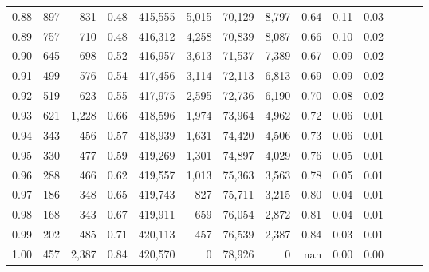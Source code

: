 \begin{tabular}{rrrrrrrrrrrrrr}
0.88 &     897 &    831 &  0.48 &  415,555 &    5,015 &  70,129 &   8,797 &  0.64 &  0.11 &      0.03 \\
0.89 &     757 &    710 &  0.48 &  416,312 &    4,258 &  70,839 &   8,087 &  0.66 &  0.10 &      0.02 \\
0.90 &     645 &    698 &  0.52 &  416,957 &    3,613 &  71,537 &   7,389 &  0.67 &  0.09 &      0.02 \\
0.91 &     499 &    576 &  0.54 &  417,456 &    3,114 &  72,113 &   6,813 &  0.69 &  0.09 &      0.02 \\
0.92 &     519 &    623 &  0.55 &  417,975 &    2,595 &  72,736 &   6,190 &  0.70 &  0.08 &      0.02 \\
0.93 &     621 &  1,228 &  0.66 &  418,596 &    1,974 &  73,964 &   4,962 &  0.72 &  0.06 &      0.01 \\
0.94 &     343 &    456 &  0.57 &  418,939 &    1,631 &  74,420 &   4,506 &  0.73 &  0.06 &      0.01 \\
0.95 &     330 &    477 &  0.59 &  419,269 &    1,301 &  74,897 &   4,029 &  0.76 &  0.05 &      0.01 \\
0.96 &     288 &    466 &  0.62 &  419,557 &    1,013 &  75,363 &   3,563 &  0.78 &  0.05 &      0.01 \\
0.97 &     186 &    348 &  0.65 &  419,743 &      827 &  75,711 &   3,215 &  0.80 &  0.04 &      0.01 \\
0.98 &     168 &    343 &  0.67 &  419,911 &      659 &  76,054 &   2,872 &  0.81 &  0.04 &      0.01 \\
0.99 &     202 &    485 &  0.71 &  420,113 &      457 &  76,539 &   2,387 &  0.84 &  0.03 &      0.01 \\
1.00 &     457 &  2,387 &  0.84 &  420,570 &        0 &  78,926 &       0 &   nan &  0.00 &      0.00 \\
\bottomrule
\end{tabular}
